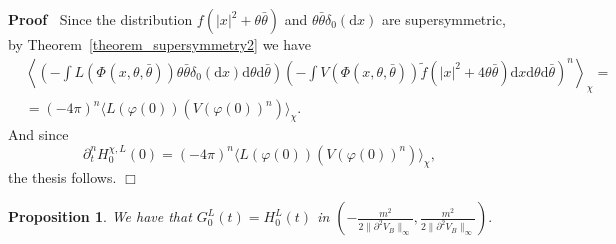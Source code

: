 \documentclass[a4paper,10pt]{article}
\newcommand{\mathd}{\mathrm{d}}
\newenvironment{proof}{\noindent\textbf{Proof\ }}{\hspace*{\fill}$\Box$\medskip}
\newtheorem{proposition}{Proposition}
{\theorembodyfont{\rmfamily}\newtheorem{remark}{Remark}}
\begin{document}
\begin{proof}
  Since the distribution $f (| x |^2 + \theta \bar{\theta})$ and $\theta
  \bar{\theta} \delta_0 (\mathd x)$ are supersymmetric, by
  Theorem~\ref{theorem_supersymmetry2} we have
  \begin{eqnarray}
    & \left\langle \left( - \int L (\Phi_{} (x, \theta, \bar{\theta})) \theta
    \bar{\theta} \delta_0 (\mathd x) \mathd \theta \mathd \bar{\theta} \right)
    \left( - \int V (\Phi (x, \theta, \bar{\theta})) \tilde{f} (| x |^2 + 4
    \theta \bar{\theta}) \mathd x \mathd \theta \mathd \bar{\theta} \right)^n
    \right\rangle_{\chi} = &  \nonumber\\
    & = (- 4 \pi)^n \langle L (\varphi (0)) (V (\varphi (0))^n)
    \rangle_{\chi} . &  \nonumber
  \end{eqnarray}
  And since
  \[ \partial^n_t H^{\chi, L}_0 (0) = (- 4 \pi)^n \langle L (\varphi (0)) (V
     (\varphi (0))^n) \rangle_{\chi}, \]
  the thesis follows. 
\end{proof}

\begin{proposition}
  \label{proposition_chi}We have that $G_0^L (t) = H^L_0 (t)$ in $\left( -
  \frac{m^2}{2 \| \partial^2 V_B \|_{\infty}}, \frac{m^2}{2 \| \partial^2 V_B
  \|_{\infty}} \right) .$
\end{proposition}
\end{document}
